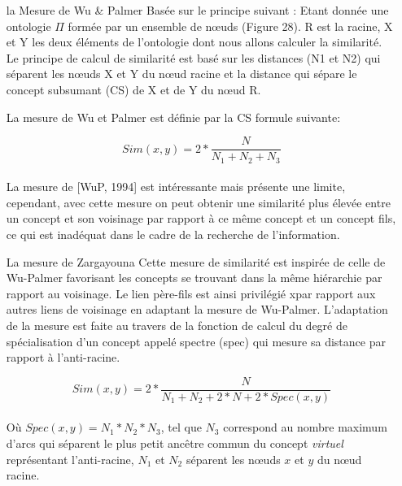   \begin{itemize}
  \item [la Mesure de Wu \& Palmer] Basée sur le principe suivant :
    Etant donnée une ontologie $\Pi$ formée par un ensemble de nœuds
    (Figure 28). R est la racine, X et Y les deux éléments de
    l’ontologie dont nous allons calculer la similarité. Le principe
    de calcul de similarité est basé sur les distances (N1 et N2) qui
    séparent les nœuds X et Y du nœud racine et la distance qui sépare
    le concept subsumant (CS) de X et de Y du nœud R.

    La mesure de Wu et Palmer est définie par la CS formule suivante:

    \begin{equation}
      \label{wu_palmer}
      Sim(x,y) = 2 *  \frac{N}{N_{1} + N_{2} + N_{3}}
    \end{equation}\\

    La mesure de [WuP, 1994] est intéressante mais présente une
    limite, cependant, avec cette mesure on peut obtenir une
    similarité plus élevée entre un concept et son voisinage par
    rapport à ce même concept et un concept fils, ce qui est inadéquat
    dans le cadre de la recherche de l’information.\\

  \item [La mesure de Zargayouna]
    Cette mesure de similarité est inspirée de celle de Wu-Palmer
    favorisant les concepts se trouvant dans la même hiérarchie par
    rapport au voisinage. Le lien père-fils est ainsi privilégié xpar
    rapport aux autres liens de voisinage en adaptant la mesure de
    Wu-Palmer. L'adaptation de la mesure est faite au travers de la
    fonction de calcul du degré de spécialisation d'un concept appelé
    spectre (spec) qui mesure sa distance par rapport à l'anti-racine.

    \begin{equation}
      \label{zargayouna}
      Sim(x,y)= 2 * \frac{N}{N_{1} + N_{2} + 2 * N + 2 * Spec(x,y)}
    \end{equation}\\

    Où $Spec(x,y)=N_{1}*N_{2} *N_{3}$, tel que $N_{3}$ correspond au
    nombre maximum d'arcs qui séparent le plus petit ancêtre commun du
    concept \textit{virtuel} représentant l'anti-racine, $N_{1}$ et
    $N_{2}$ séparent les nœuds $x$ et $y$ du nœud racine.\\
  \end{itemize}

